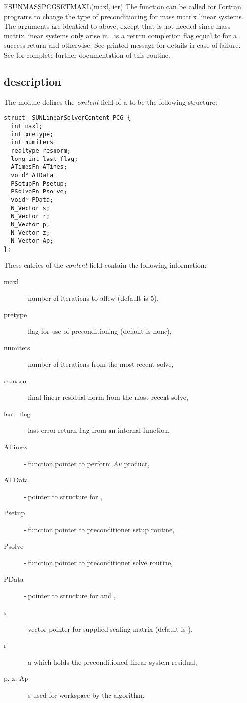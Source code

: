{
  FSUNMASSPCGSETMAXL(maxl, ier)
}
{
  The function  can be called for Fortran
  programs to change the type of preconditioning for mass matrix
  linear systems.
}
{
  The arguments are identical to  above, except that
   is not needed since mass matrix linear systems only arise
  in {\arkode}.
}
{
   is a  return completion flag equal to  for a success
  return and  otherwise. See printed message for details in case
  of failure.
}
{
  See  for complete further documentation of
  this routine.
}


\subsection{{\sunlinsolpcg} description}\label{ss:sunlinsol_pcg_description}


The {\sunlinsolpcg} module defines the {\em content} field of a
 to be the following structure:
\begin{verbatim}
struct _SUNLinearSolverContent_PCG {
  int maxl;
  int pretype;
  int numiters;
  realtype resnorm;
  long int last_flag;
  ATimesFn ATimes;
  void* ATData;
  PSetupFn Psetup;
  PSolveFn Psolve;
  void* PData;
  N_Vector s;
  N_Vector r;
  N_Vector p;
  N_Vector z;
  N_Vector Ap;
};
\end{verbatim}
These entries of the \emph{content} field contain the following
information:
\begin{description}
  \item[maxl] - number of {\pcg} iterations to allow (default is 5),
  \item[pretype] - flag for use of preconditioning (default is none),
  \item[numiters] - number of iterations from the most-recent solve,
  \item[resnorm] - final linear residual norm from the most-recent solve,
  \item[last\_flag] - last error return flag from an internal function,
  \item[ATimes] - function pointer to perform $Av$ product,
  \item[ATData] - pointer to structure for ,
  \item[Psetup] - function pointer to preconditioner setup routine,
  \item[Psolve] - function pointer to preconditioner solve routine,
  \item[PData] - pointer to structure for  and ,
  \item[s] - vector pointer for supplied scaling matrix
    (default is ),
  \item[r] - a {\nvector} which holds the preconditioned linear system
    residual,
  \item[p, z, Ap] - {\nvector}s used for workspace by the
    {\pcg} algorithm.
\end{description}

